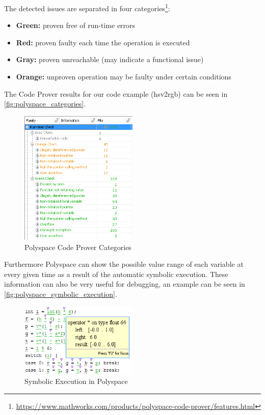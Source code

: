 \documentclass{scrreprt}
\begin{document}
The detected issues are separated in four categories\footnote{\url{https://www.mathworks.com/products/polyspace-code-prover/features.html}}:
 \begin{itemize}
 	\item \textbf{Green:} proven free of run-time errors
 	\item \textbf{Red:} proven faulty each time the operation is executed
 	\item \textbf{Gray:} proven unreachable (may indicate a functional issue)
 	\item \textbf{Orange:} unproven operation may be faulty under certain conditions
 \end{itemize}

The Code Prover results for our code example (hsv2rgb) can be seen in \vref{fig:polyspace_categories}.

\begin{figure}[h]
	\centering
	\includegraphics[width=0.5\textwidth]{img/polyspace_categories}
	\caption[Polyspace Code Prover Categories]{Polyspace Code Prover Categories}
	\label{fig:polyspace_categories}
\end{figure}

Furthermore Polyspace can show the possible value range of each variable at every given time as a result of the automatic symbolic execution. These information can also be very useful for debugging, an example can be seen in \vref{fig:polyspace_symbolic_execution}.

\begin{figure}[h]
	\centering
	\includegraphics[width=0.5\textwidth]{img/polyspace_symbolic_execution}
	\caption[Symbolic Execution in Polyspace]{Symbolic Execution in Polyspace}
	\label{fig:polyspace_symbolic_execution}
\end{figure}
\end{document}
